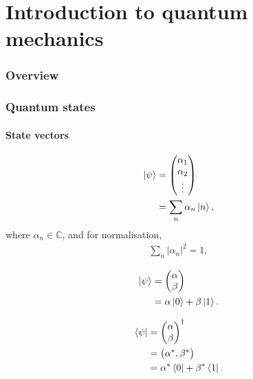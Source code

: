 \documentclass[aps,pra,twocolumn,amsmath,amssymb,nofootinbib,superscriptaddress]{revtex4}
\begin{document}
\part{Introduction to quantum mechanics}

%
%

\section{Overview}

%
%

\section{Quantum states}

%
%

\subsection{State vectors}

\begin{align}
	\ket\psi &= \left(\begin{matrix}{}
	\alpha_1\\
	\alpha_2\\
	\vdots
\end{matrix}\right)\nonumber\\
	&= \sum_n \alpha_n \ket{n},
\end{align}
where \mbox{$\alpha_n\in\mathbb{C}$}, and for normalisation,
\begin{align}\label{eq:state_norm_cond}
\sum_n |\alpha_n|^2 = 1,	
\end{align}

\begin{align}
\ket\psi &= \left(\begin{matrix}{}
	\alpha \\
	\beta
\end{matrix}\right)\nonumber\\
&= \alpha\ket{0} + \beta\ket{1}.
\end{align}

\begin{align}
\bra\psi &= \left(\begin{matrix}{}
	\alpha \\
	\beta
\end{matrix}\right)^\dag\nonumber\\
&=\left(\begin{matrix}{}
	\alpha^*, \beta^*
\end{matrix}\right)\nonumber\\
&= \alpha^*\bra{0} + \beta^*\bra{1}.
\end{align}
\end{document}
